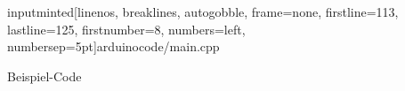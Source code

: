 
\begin{code}[H]
  \­inputminted[linenos, breaklines, autogobble, frame=none,
    firstline=113, %
    lastline=125, %
    firstnumber=8, %
    numbers=left,
    numbersep=5pt]{arduino}{code/main.cpp} %
  \caption{Beispiel-Code}
  \label{code:bsp2}
\end{code}